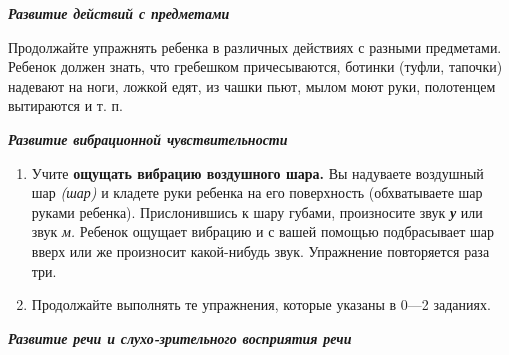 \documentclass[a5paper]{book}
\renewcommand{\emph}[1]{\textit{#1}}
\begin{document}
\emph{\textbf{Развитие действий с предметами}}

Продолжайте упражнять ребенка в различных действиях с разными
предметами. Ребенок должен знать, что гребешком причесываются, ботинки
(туфли, тапочки) надевают на ноги, ложкой едят, из чашки пьют, мылом
моют руки, полотенцем вытираются и т. п.

\emph{\textbf{Развитие вибрационной чувствительности}}


\begin{enumerate}
\def\labelenumi{\arabic{enumi}.}
\item
  
  Учите \textbf{ощущать вибрацию воздушного шара.} Вы надуваете
  воздушный шар \emph{(шар)} и кладете руки ребенка на его поверхность
  (обхватываете шар руками ребенка). Прислонившись к шару губами,
  произносите звук \emph{\textbf{у}} или звук \emph{м.} Ребенок ощущает
  вибрацию и с вашей помощью подбрасывает шар вверх или же произносит
  какой-нибудь звук. Упражнение повторяется раза три.
  
\item
  
  Продолжайте выполнять те упражнения, которые указаны в 0---2 заданиях.
  
\end{enumerate}


\emph{\textbf{Развитие речи и слухо-зрительного восприятия речи}}
\end{document}
